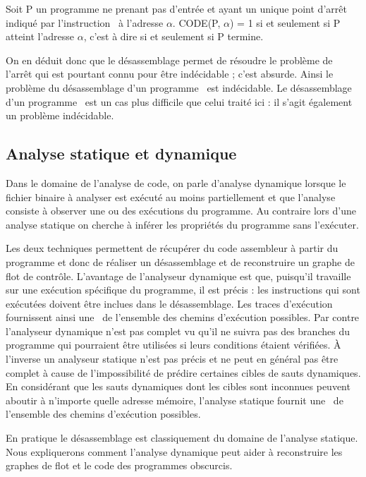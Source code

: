 Soit P un programme ne prenant pas d'entrée et ayant un unique point d'arrêt indiqué par l'instruction \halt\ à l'adresse $\alpha$.
CODE(P, $\alpha$) = 1 si et seulement si P atteint l'adresse $\alpha$, c'est à dire si et seulement si P termine.

On en déduit donc que le désassemblage permet de résoudre le problème de l'arrêt qui est pourtant connu pour être indécidable ; c'est absurde.
Ainsi le problème du désassemblage d'un programme \nsm\ est indécidable.
Le désassemblage d'un programme \sm\ est un cas plus difficile que celui traité ici : il s'agit également un problème indécidable.


\subsection{Analyse statique et dynamique}
Dans le domaine de l'analyse de code, on parle d'analyse dynamique lorsque le fichier binaire à analyser est exécuté au moins partiellement et que l'analyse consiste à observer une ou des exécutions du programme. Au contraire lors d'une analyse statique on cherche à inférer les propriétés du programme sans l'exécuter.

Les deux techniques permettent de récupérer du code assembleur à partir du programme et donc de réaliser un désassemblage et de reconstruire un graphe de flot de contrôle.
L'avantage de l'analyseur dynamique est que, puisqu'il travaille sur une exécution spécifique du programme, il est précis : les instructions qui sont exécutées doivent être inclues dans le désassemblage.
Les traces d'exécution fournissent ainsi une \sousa\ de l'ensemble des chemins d'exécution possibles.
Par contre l'analyseur dynamique n'est pas complet vu qu'il ne suivra pas des branches du programme qui pourraient être utilisées si leurs conditions étaient vérifiées. À l'inverse un analyseur statique n'est pas précis et ne peut en général pas être complet à cause de l'impossibilité de prédire certaines cibles de sauts dynamiques. En considérant que les sauts dynamiques dont les cibles sont inconnues peuvent aboutir à n'importe quelle adresse mémoire, l'analyse statique fournit une \sura\ de l'ensemble des chemins d'exécution possibles.

En pratique le désassemblage est classiquement du domaine de l'analyse statique. Nous expliquerons comment l'analyse dynamique peut aider à reconstruire les graphes de flot et le code des programmes obscurcis.


